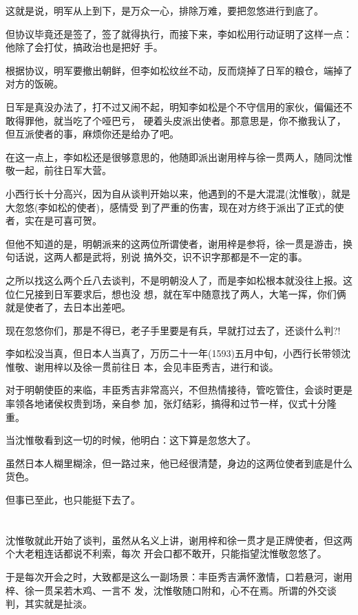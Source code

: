 \documentclass[11pt,a4paper,onecolumn]{article}
\begin{document}
这就是说，明军从上到下，是万众一心，排除万难，要把忽悠进行到底了。

但协议毕竟还是签了，签了就得执行，而接下来，李如松用行动证明了这样一点：他除了会打仗，搞政治也是把好
手。

根据协议，明军要撤出朝鲜，但李如松纹丝不动，反而烧掉了日军的粮仓，端掉了对方的饭碗。

日军是真没办法了，打不过又闹不起，明知李如松是个不守信用的家伙，偏偏还不敢得罪他，就当吃了个哑巴亏，
硬着头皮派出使者。那意思是，你不撤我认了，但互派使者的事，麻烦你还是给办了吧。

在这一点上，李如松还是很够意思的，他随即派出谢用梓与徐一贯两人，随同沈惟敬一起，前往日军大营。

小西行长十分高兴，因为自从谈判开始以来，他遇到的不是大混混(沈惟敬)，就是大忽悠(李如松的使者)，感情受
到了严重的伤害，现在对方终于派出了正式的使者，实在是可喜可贺。

但他不知道的是，明朝派来的这两位所谓使者，谢用梓是参将，徐一贯是游击，换句话说，这两人都是武将，别说
搞外交，识不识字那都是不一定的事。

之所以找这么两个丘八去谈判，不是明朝没人了，而是李如松根本就没往上报。这位仁兄接到日军要求后，想也没
想，就在军中随意找了两人，大笔一挥，你们俩就是使者了，去日本出差吧。

现在忽悠你们，那是不得已，老子手里要是有兵，早就打过去了，还谈什么判?!

李如松没当真，但日本人当真了，万历二十一年(1593)五月中旬，小西行长带领沈惟敬、谢用梓以及徐一贯前往日
本，会见丰臣秀吉，进行和谈。

对于明朝使臣的来临，丰臣秀吉非常高兴，不但热情接待，管吃管住，会谈时更是率领各地诸侯权贵到场，亲自参
加，张灯结彩，搞得和过节一样，仪式十分隆重。

当沈惟敬看到这一切的时候，他明白：这下算是忽悠大了。

虽然日本人糊里糊涂，但一路过来，他已经很清楚，身边的这两位使者到底是什么货色。

但事已至此，也只能挺下去了。

\section[\thesection]{}

沈惟敬就此开始了谈判，虽然从名义上讲，谢用梓和徐一贯才是正牌使者，但这两个大老粗连话都说不利索，每次
开会口都不敢开，只能指望沈惟敬忽悠了。

于是每次开会之时，大致都是这么一副场景：丰臣秀吉满怀激情，口若悬河，谢用梓、徐一贯呆若木鸡、一言不
发，沈惟敬随口附和，心不在焉。所谓的外交谈判，其实就是扯淡。
\end{document}
